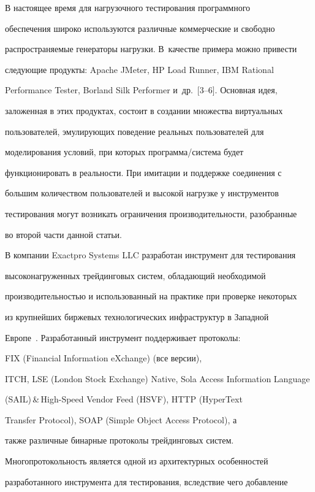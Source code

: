   В настоящее время для нагрузочного тестирования программного


обеспечения широко используются различные коммерческие и свободно


распространяемые генераторы нагрузки. В~качестве примера можно привести


сле\-ду\-ющие продукты: Apache JMeter, HP Load Runner, IBM Rational


Performance Tester, Borland Silk Performer и~др.~[3--6]. Основная идея,


заложенная в этих продуктах, состоит в создании множества виртуальных


пользователей, эмулирующих поведение реальных пользователей для


моделирования условий, при которых про\-грам\-ма/сис\-те\-ма будет


функционировать в реальности. При имитации и поддержке соединения с


большим количеством пользователей и высокой нагрузке у инструментов


тестирования могут возникать ограничения производительности, разобранные


во второй части данной статьи.





  В компании Exactpro Systems LLC разработан инструмент для тестирования


высоконагруженных трейдинговых систем, обладающий необходимой


производительностью и использованный на практике при проверке некоторых


из крупнейших биржевых технологических инфраструктур в Западной


Европе~\cite{7-g, 8-g}. Разработанный инструмент поддерживает протоколы:


FIX (Financial Information eXchange) (все версии),


ITCH, LSE (London Stock Exchange) Native, Sola Access Information Language


(SAIL)\,\&\,High-Speed Vendor Feed (HSVF), HTTP (HyperText


Transfer Protocol), SOAP (Simple Object Access Protocol), а


также различные бинарные протоколы трейдинговых систем.


Многопротокольность является одной из архитектурных особенностей


разработанного инструмента для тестирования, вследствие чего добавление



